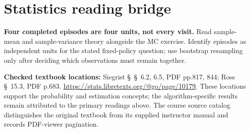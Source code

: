 \documentclass[11pt]{scrartcl}
\begin{document}
\section*{Statistics reading bridge}
\textbf{Four completed episodes are four units, not every visit.} Read sample-mean and sample-variance theory alongside the MC exercise. Identify episodes as independent units for the stated fixed-policy question; use bootstrap resampling only after deciding which observations must remain together.

\textbf{Checked textbook locations:} Siegrist \S~\S~6.2, 6.5, PDF pp.817, 844; Ross \S~15.3, PDF p.683. \url{https://stats.libretexts.org/@go/page/10179}. These locations support the probability and estimation concepts; the algorithm-specific results remain attributed to the primary readings above. The course source catalog distinguishes the original textbook from its supplied instructor manual and records PDF-viewer pagination.
\end{document}
